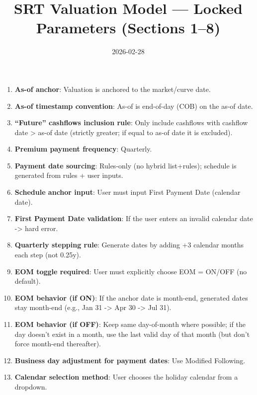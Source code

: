 \documentclass[11pt]{article}
\title{SRT Valuation Model — Locked Parameters (Sections 1--8)}
\date{2026-02-28}
\begin{document}
\maketitle

\begin{enumerate}[label=\arabic*),leftmargin=*,align=left]
\item \textbf{As-of anchor}: Valuation is anchored to the market/curve date.

\item \textbf{As-of timestamp convention}: As-of is end-of-day (COB) on the as-of date.

\item \textbf{“Future” cashflows inclusion rule}: Only include cashflows with cashflow date > as-of date (strictly greater; if equal to as-of date it is excluded).

\item \textbf{Premium payment frequency}: Quarterly.

\item \textbf{Payment date sourcing}: Rules-only (no hybrid list+rules); schedule is generated from rules + user inputs.

\item \textbf{Schedule anchor input}: User must input First Payment Date (calendar date).

\item \textbf{First Payment Date validation}: If the user enters an invalid calendar date -> hard error.

\item \textbf{Quarterly stepping rule}: Generate dates by adding +3 calendar months each step (not 0.25y).

\item \textbf{EOM toggle required}: User must explicitly choose EOM = ON/OFF (no default).

\item \textbf{EOM behavior (if ON)}: If the anchor date is month-end, generated dates stay month-end (e.g., Jan 31 -> Apr 30 -> Jul 31).

\item \textbf{EOM behavior (if OFF)}: Keep same day-of-month where possible; if the day doesn’t exist in a month, use the last valid day of that month (but don’t force month-end thereafter).

\item \textbf{Business day adjustment for payment dates}: Use Modified Following.

\item \textbf{Calendar selection method}: User chooses the holiday calendar from a dropdown.


\end{enumerate}
\end{document}
